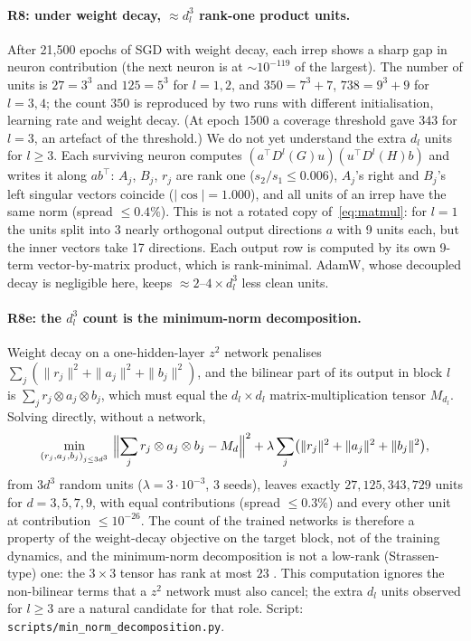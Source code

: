 \documentclass[a4paper,11pt]{article}
\theoremstyle{remark}
\theoremstyle{definition}
\begin{document}
\paragraph{R8: under weight decay, $\approx d_l^3$ rank-one product units.}
After 21{,}500 epochs of SGD with weight decay, each irrep shows a sharp gap in
neuron contribution (the next neuron is at $\sim10^{-119}$ of the largest). The
number of units is $27=3^3$ and $125=5^3$ for $l=1,2$, and $350=7^3+7$,
$738=9^3+9$ for $l=3,4$; the count $350$ is reproduced by two runs with different
initialisation, learning rate and weight decay. (At epoch 1500 a coverage
threshold gave $343$ for $l=3$, an artefact of the threshold.) We do not yet
understand the extra $d_l$ units for $l\ge3$. Each surviving neuron computes
$(a^\top D^l(G)u)(u^\top D^l(H)b)$ and writes it along $ab^\top$: $A_j$, $B_j$,
$r_j$ are rank one ($s_2/s_1\le0.006$), $A_j$'s right and $B_j$'s left singular
vectors coincide ($|\cos|=1.000$), and all units of an irrep have the same norm
(spread $\le0.4\%$). This is not a rotated copy of~\eqref{eq:matmul}: for $l=1$
the units split into 3 nearly orthogonal output directions $a$ with 9 units each,
but the inner vectors take 17 directions. Each output row is computed by its own
9-term vector-by-matrix product, which is rank-minimal. AdamW, whose decoupled decay is negligible
here, keeps $\approx2$--$4\times d_l^3$ less clean units.

\paragraph{R8e: the $d_l^3$ count is the minimum-norm decomposition.} Weight decay on
a one-hidden-layer $z^2$ network penalises $\sum_j(\|r_j\|^2+\|a_j\|^2+\|b_j\|^2)$, and
the bilinear part of its output in block $l$ is $\sum_j r_j\otimes a_j\otimes b_j$,
which must equal the $d_l\times d_l$ matrix-multiplication tensor $M_{d_l}$. Solving
directly, without a network,
\[
\min_{(r_j,a_j,b_j)_{j\le3d^3}}\ \Bigl\|\sum_j r_j\otimes a_j\otimes b_j-M_d\Bigr\|^2
+\lambda\sum_j\bigl(\|r_j\|^2+\|a_j\|^2+\|b_j\|^2\bigr),
\]
from $3d^3$ random units ($\lambda=3\cdot10^{-3}$, 3 seeds), leaves exactly
$27,125,343,729$ units for $d=3,5,7,9$, with equal contributions (spread
$\le0.3\%$) and every other unit at contribution $\le10^{-26}$. The count of the
trained networks is therefore a property of the weight-decay objective on the target
block, not of the training dynamics, and the minimum-norm decomposition is not a
low-rank (Strassen-type) one: the $3\times3$ tensor has rank at most $23$
\cite{laderman1976}. This computation ignores the non-bilinear terms that a $z^2$
network must also cancel; the extra $d_l$ units observed for $l\ge3$ are a natural
candidate for that role. Script: \texttt{scripts/min\_norm\_decomposition.py}.
\end{document}

